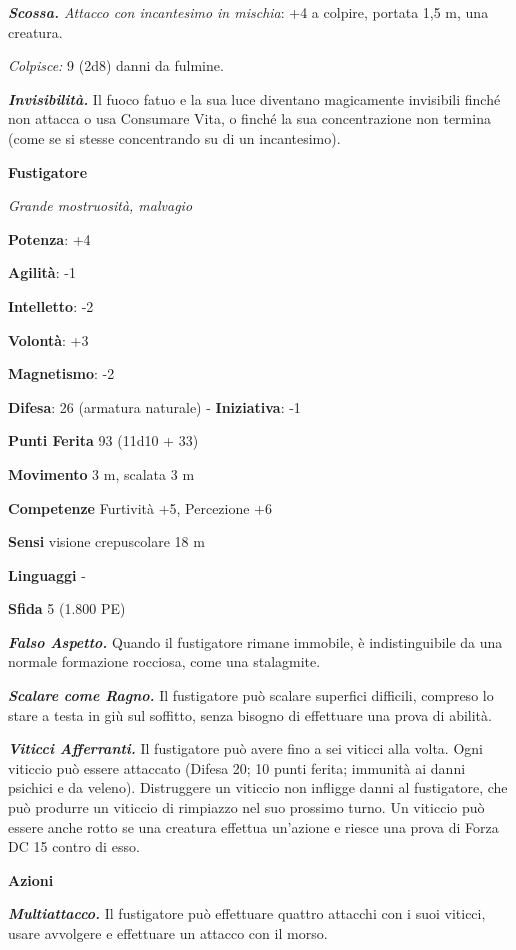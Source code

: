 \begin{multicols}{2}
\emph{\textbf{Scossa.} Attacco con incantesimo in mischia}: +4 a
colpire, portata 1,5 m, una creatura.

\emph{Colpisce:} 9 (2d8) danni da fulmine.

\emph{\textbf{Invisibilità.}} Il fuoco fatuo e la sua luce diventano
magicamente invisibili finché non attacca o usa Consumare Vita, o finché
la sua concentrazione non termina (come se si stesse concentrando su di
un incantesimo).

\textbf{Fustigatore}

\emph{Grande mostruosità, malvagio}

\textbf{Potenza}: +4

\textbf{Agilità}: -1

\textbf{Intelletto}: -2

\textbf{Volontà}: +3

\textbf{Magnetismo}: -2

\textbf{Difesa}: 26 (armatura naturale) - \textbf{Iniziativa}: -1

\textbf{Punti Ferita} 93 (11d10 + 33)

\textbf{Movimento} 3 m, scalata 3 m

\textbf{Competenze} Furtività +5, Percezione +6

\textbf{Sensi} visione crepuscolare 18 m

\textbf{Linguaggi} -

\textbf{Sfida} 5 (1.800 PE)

\emph{\textbf{Falso Aspetto.}} Quando il fustigatore rimane immobile, è
indistinguibile da una normale formazione rocciosa, come una stalagmite.

\emph{\textbf{Scalare come Ragno.}} Il fustigatore può scalare superfici
difficili, compreso lo stare a testa in giù sul soffitto, senza bisogno
di effettuare una prova di abilità.

\emph{\textbf{Viticci Afferranti.}} Il fustigatore può avere fino a sei
viticci alla volta. Ogni viticcio può essere attaccato (Difesa 20; 10 punti
ferita; immunità ai danni psichici e da veleno). Distruggere un viticcio
non infligge danni al fustigatore, che può produrre un viticcio di
rimpiazzo nel suo prossimo turno. Un viticcio può essere anche rotto se
una creatura effettua un'azione e riesce una prova di Forza DC 15 contro
di esso.

\textbf{Azioni}

\emph{\textbf{Multiattacco.}} Il fustigatore può effettuare quattro
attacchi con i suoi viticci, usare avvolgere e effettuare un attacco con
il morso.


\end{multicols}
